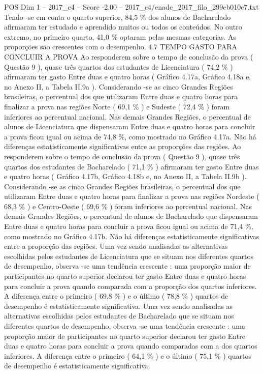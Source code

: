 \begin{textsample}{POS Dim 1 – 2017\_c4 – Score -2.00 – 2017\_c4/enade\_2017\_filo\_299cb010c7.txt}
Tendo -se em conta o quarto superior, 84,5 \% dos alunos de Bacharelado afirmaram ter estudado e aprendido muitos ou todos os conteúdos.
No outro extremo, no primeiro quarto, 41,0 \% optaram pelas mesmas categorias.
As proporções são crescentes com o desempenho. 4.7 TEMPO GASTO PARA CONCLUIR A PROVA Ao responderem sobre o tempo de conclusão da prova ( Questão 9 ), quase três quartos dos estudantes de Licenciatura ( 74,2 \% ) afirmaram ter gasto Entre duas e quatro horas ( Gráfico 4.17a, Gráfico 4.18a e, no Anexo II, a Tabela II.9a ).
Considerando -se as cinco Grandes Regiões brasileiras, o percentual dos que utilizaram Entre duas e quatro horas para finalizar a prova nas regiões Norte ( 69,1 \% ) e Sudeste ( 72,4 \% ) foram inferiores ao percentual nacional.
Nas demais Grandes Regiões, o percentual de alunos de Licenciatura que dispensaram Entre duas e quatro horas para concluir a prova ficou igual ou acima de 74,8 \%, como mostrado no Gráfico 4.17a.
Não há diferenças estatisticamente significativas entre as proporções das regiões.
Ao responderem sobre o tempo de conclusão da prova ( Questão 9 ), quase três quartos dos estudantes de Bacharelado ( 71,1 \% ) afirmaram ter gasto Entre duas e quatro horas ( Gráfico 4.17b, Gráfico 4.18b e, no Anexo II, a Tabela II.9b ).
Considerando -se as cinco Grandes Regiões brasileiras, o percentual dos que utilizaram Entre duas e quatro horas para finalizar a prova nas regiões Nordeste ( 68,3 \% ) e Centro-Oeste ( 69,6 \% ) foram inferiores ao percentual nacional.
Nas demais Grandes Regiões, o percentual de alunos de Bacharelado que dispensaram Entre duas e quatro horas para concluir a prova ficou igual ou acima de 71,4 \%, como mostrado no Gráfico 4.17b.
Não há diferenças estatisticamente significativas entre a proporção das regiões.
Uma vez sendo analisadas as alternativas escolhidas pelos estudantes de Licenciatura que se situam nos diferentes quartos de desempenho, observa -se uma tendência crescente : uma proporção maior de participantes no quarto superior declarou ter gasto Entre duas e quatro horas para concluir a prova quando comparada com a proporção dos quartos inferiores.
A diferença entre o primeiro ( 69,8 \% ) e o último ( 78,8 \% ) quartos de desempenho é estatisticamente significativa.
Uma vez sendo analisadas as alternativas escolhidas pelos estudantes de Bacharelado que se situam nos diferentes quartos de desempenho, observa -se uma tendência crescente : uma proporção maior de participantes no quarto superior declarou ter gasto Entre duas e quatro horas para concluir a prova quando comparadas com a dos quartos inferiores.
A diferença entre o primeiro ( 64,1 \% ) e o último ( 75,1 \% ) quartos de desempenho é estatisticamente significativa.

\end{textsample}
